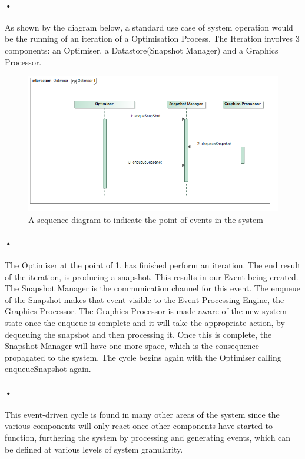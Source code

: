 \documentclass[11pt]{article}
\begin{document}
\paragraph{•}
As shown by the diagram below, a standard use case of system operation would be the running of an iteration of a Optimisation Process. The Iteration involves 3 components: an Optimiser, a Datastore(Snapshot Manager) and a Graphics Processor.
\begin{figure}[h]
\includegraphics[scale=0.45]{systemExample.png}
\caption{A sequence diagram to indicate the point of events in the system}
\end{figure}

\paragraph{•}
The Optimiser at the point of 1, has finished perform an iteration. The end result of the iteration, is producing a snapshot. This results in our Event being created. The Snapshot Manager is the communication channel for this event. The enqueue of the Snapshot makes that event visible to the Event Processing Engine, the Graphics Processor. The Graphics Processor is made aware of the new system state once the enqueue is complete and it will take the appropriate action, by dequeuing the snapshot and then processing it. Once this is complete, the Snapshot Manager will have one more space, which is the consequence propagated to the system. The cycle begins again with the Optimiser calling enqueueSnapshot again.
\paragraph{•}
This event-driven cycle is found in many other areas of the system since the various components will only react once other components have started to function, furthering the system by processing and generating events, which can be defined at various levels of system granularity.
\end{document}
